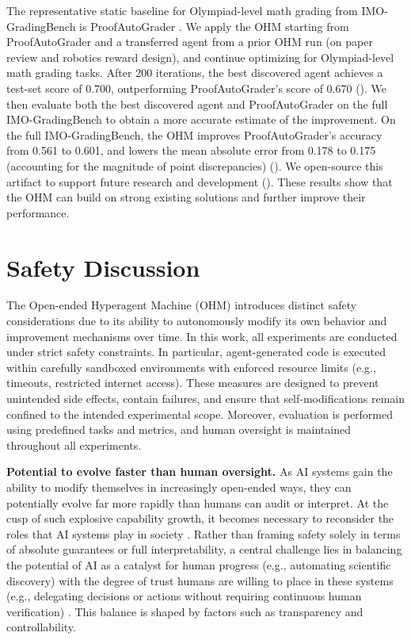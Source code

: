 \documentclass[]{fairmeta}
\begin{document}
The representative static baseline for Olympiad-level math grading from IMO-GradingBench is ProofAutoGrader \citep{luong2025towards}. We apply the OHM starting from ProofAutoGrader and a transferred agent from a prior OHM run (on paper review and robotics reward design), and continue optimizing for Olympiad-level math grading tasks. After 200 iterations, the best discovered agent achieves a test-set score of 0.700, outperforming ProofAutoGrader's score of 0.670 (). We then evaluate both the best discovered agent and ProofAutoGrader on the full IMO-GradingBench to obtain a more accurate estimate of the improvement. On the full IMO-GradingBench, the OHM improves ProofAutoGrader's accuracy from 0.561 to 0.601, and lowers the mean absolute error from 0.178 to 0.175 (accounting for the magnitude of point discrepancies) (). We open-source this artifact to support future research and development (). These results show that the OHM can build on strong existing solutions and further improve their performance.


\section{Safety Discussion}
\label{sec:safety}

The Open-ended Hyperagent Machine (OHM) introduces distinct safety considerations due to its ability to autonomously modify its own behavior and improvement mechanisms over time. In this work, all experiments are conducted under strict safety constraints. In particular, agent-generated code is executed within carefully sandboxed environments with enforced resource limits (e.g., timeouts, restricted internet access). These measures are designed to prevent unintended side effects, contain failures, and ensure that self-modifications remain confined to the intended experimental scope. Moreover, evaluation is performed using predefined tasks and metrics, and human oversight is maintained throughout all experiments.

\textbf{Potential to evolve faster than human oversight.}
As AI systems gain the ability to modify themselves in increasingly open-ended ways, they can potentially evolve far more rapidly than humans can audit or interpret. At the cusp of such explosive capability growth, it becomes necessary to reconsider the roles that AI systems play in society \citep{bengio2024managing}. Rather than framing safety solely in terms of absolute guarantees or full interpretability, a central challenge lies in balancing the potential of AI as a catalyst for human progress (e.g., automating scientific discovery) with the degree of trust humans are willing to place in these systems (e.g., delegating decisions or actions without requiring continuous human verification) \citep{ecoffet2020open, weston2025ai}. This balance is shaped by factors such as transparency and controllability.
\end{document}
